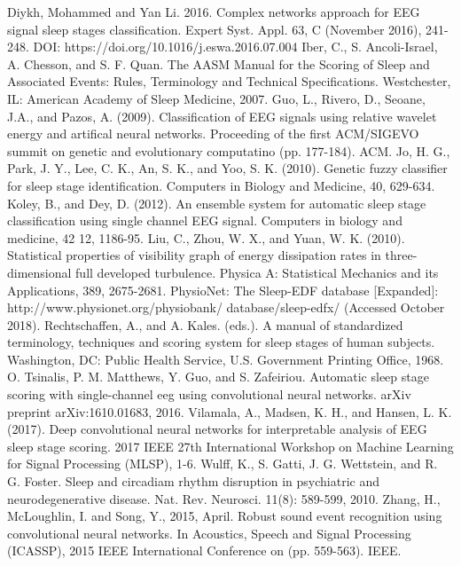 \documentclass{amia}
\begin{document}

\begin{thebibliography}{1}
\setlength\itemsep{-0.1em}

Diykh, Mohammed and Yan Li. 2016. Complex networks approach for EEG signal sleep stages classification. Expert Syst. Appl. 63, C (November 2016), 241-248. DOI: https://doi.org/10.1016/j.eswa.2016.07.004 
Iber, C., S. Ancoli-Israel, A. Chesson, and S. F. Quan. The AASM Manual for the Scoring of Sleep and Associated Events: Rules, Terminology and Technical Specifications. Westchester, IL: American Academy of Sleep Medicine, 2007.
Guo, L., Rivero, D., Seoane, J.A., and Pazos, A. (2009). Classification of EEG signals using relative wavelet energy and artifical neural networks. Proceeding of the first ACM/SIGEVO summit on genetic and evolutionary computatino (pp. 177-184). ACM.
Jo, H. G., Park, J. Y., Lee, C. K., An, S. K., and Yoo, S. K. (2010). Genetic fuzzy classifier for sleep stage identification. Computers in Biology and Medicine, 40, 629-634.
Koley, B., and Dey, D. (2012). An ensemble system for automatic sleep stage classification using single channel EEG signal. Computers in biology and medicine, 42 12, 1186-95.
Liu, C., Zhou, W. X., and Yuan, W. K. (2010). Statistical properties of visibility graph of energy dissipation rates in three-dimensional full developed turbulence. Physica A: Statistical Mechanics and its Applications, 389, 2675-2681.
PhysioNet: The Sleep-EDF database [Expanded]: http://www.physionet.org/physiobank/ database/sleep-edfx/ (Accessed October 2018).
Rechtschaffen, A., and A. Kales. (eds.). A manual of standardized terminology, techniques and scoring system for sleep stages of human subjects. Washington, DC: Public Health Service, U.S. Government Printing Office, 1968.
O. Tsinalis, P. M. Matthews, Y. Guo, and S. Zafeiriou. Automatic sleep stage scoring with single-channel eeg using convolutional neural networks. arXiv preprint arXiv:1610.01683, 2016.
Vilamala, A., Madsen, K. H., and Hansen, L. K. (2017). Deep convolutional neural networks for interpretable analysis of EEG sleep stage scoring. 2017 IEEE 27th International Workshop on Machine Learning for Signal Processing (MLSP), 1-6.
Wulff, K., S. Gatti, J. G. Wettstein, and R. G. Foster. Sleep and circadiam rhythm disruption in psychiatric and neurodegenerative disease. Nat. Rev. Neurosci. 11(8): 589-599, 2010.
Zhang, H., McLoughlin, I. and Song, Y., 2015, April. Robust sound event recognition using convolutional neural networks. In Acoustics, Speech and Signal Processing (ICASSP), 2015 IEEE International Conference on (pp. 559-563). IEEE.




\end{thebibliography}
\end{document}
